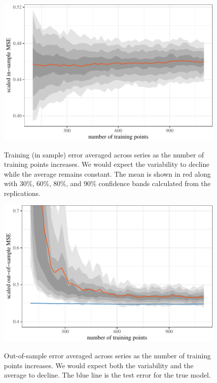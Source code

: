 \documentclass[11pt]{article}
\begin{document}
\begin{figure}[t]

{\centering \includegraphics{gfx/train-error-1} }

\caption{Training (in sample) error averaged across series as the number of training points increases. We would expect the variability to decline while the average remains constant. The mean is shown in red along with 30\%, 60\%, 80\%, and 90\% confidence bands calculated from the replications.}\label{fig:train-error}
\end{figure}

\begin{figure}[t]

{\centering \includegraphics{gfx/test-error-1} }

\caption{Out-of-sample error averaged across series as the number of training points increases. We would expect both the variability and the average to decline. The blue line is the test error for the true model.}\label{fig:test-error}
\end{figure}
\end{document}
